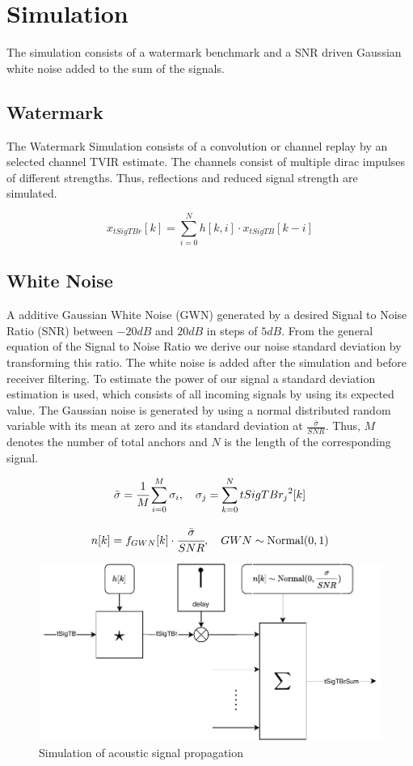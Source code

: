 \chapter{Simulation}
The simulation consists of a watermark benchmark \cite{watermark15} and a SNR driven Gaussian white noise added to the sum of the signals.
\section{Watermark}
The Watermark Simulation consists of a convolution or channel replay by an selected channel TVIR estimate. The channels consist of multiple dirac impulses of different strengths. Thus, reflections and reduced signal strength are simulated.\


\begin{equation}
	x_{tSigTBr}[k]=\sum_{i=0}^{N}h[k,i]\cdot x_{tSigTB}[k-i]
\end{equation}

\section{White Noise}
A additive Gaussian White Noise (GWN) generated by a desired Signal to Noise Ratio (SNR) between $-20dB$ and $20dB$ in steps of $5dB$. From the general equation of the Signal to Noise Ratio we derive our noise standard deviation by transforming this ratio. The white noise is added after the simulation and before receiver filtering. To estimate the power of our signal a standard deviation estimation is used, which consists of all incoming signals by using its expected value. The Gaussian noise is generated by using a normal distributed random variable with its mean at zero and its standard deviation at $\frac{\bar{\sigma}}{SNR}$. Thus, $M$ denotes the number of total anchors and $N$ is the length of the corresponding signal.

\begin{equation}	
	\bar{\sigma}=\cfrac{1}{M}\sum_{i=0}^{M}\sigma_i,~~~\sigma_j=\sum_{k=0}^{N}{tSigTBr_j}^2[k]
\end{equation}


\begin{equation}
	n[k]=f_{GWN}[k]\cdot \cfrac{\bar{\sigma}}{SNR},~~~GWN\sim\text{Normal}(0,1)
\end{equation}

\begin{figure}[h]
	\includegraphics[width=\linewidth]{images/simsig}
	
	\caption{Simulation of acoustic signal propagation}
	\label{fig:simsig}
\end{figure}
